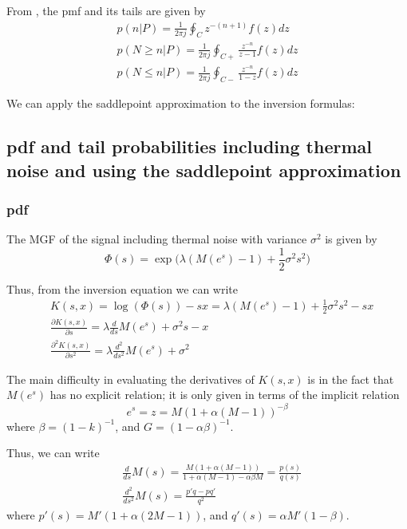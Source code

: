 \documentclass[a4paper]{article}
\begin{document}
From \cite{ber-saddlepoint-approx}, the pmf and its tails are given by
\begin{align}
p(n|P) = \frac{1}{2\pi j}\oint_C z^{-(n+1)}f(z)dz \\
p(N \geq n| P) = \frac{1}{2\pi j}\oint_{C+} \frac{z^{-n}}{z-1}f(z)dz \\
p(N \leq n| P) = \frac{1}{2\pi j}\oint_{C-} \frac{z^{-n}}{1-z}f(z)dz
\end{align}

We can apply the saddlepoint approximation to the inversion formulas: 

\subsection{pdf and tail probabilities including thermal noise and using the saddlepoint approximation}
\subsubsection{pdf}
The MGF of the signal including thermal noise with variance $\sigma^2$ is given by
\begin{equation}
\Phi (s) = \exp\Big(\lambda (M(e^s) - 1) + \frac{1}{2}\sigma^2s^2\Big)
\end{equation}

Thus, from the inversion equation we can write
\begin{align}
& K(s,x) = \log (\Phi(s)) - sx = \lambda (M(e^s) - 1) + \frac{1}{2}\sigma^2s^2 - sx \\
&\frac{\partial K(s,x)}{\partial s} = \lambda \frac{d}{ds}M(e^s) + \sigma^2s - x \\
&\frac{\partial^2 K(s,x)}{\partial s^2} = \lambda \frac{d^2}{ds^2}M(e^s) + \sigma^2
\end{align}

The main difficulty in evaluating the derivatives of $K(s,x)$ is in the fact that $M(e^s)$ has no explicit relation; it is only given in terms of the implicit relation
\begin{equation}
e^s = z = M(1 + \alpha(M-1))^{-\beta}
\end{equation}
where $\beta = (1 - k)^{-1}$, and $G = (1-\alpha\beta)^{-1}$.

Thus, we can write
\begin{align}
&\frac{d}{ds}M(s) = \frac{M(1 + \alpha (M-1))}{1 + \alpha(M-1) - \alpha\beta M} = \frac{p(s)}{q(s)}\\
&\frac{d^2}{ds^2}M(s) = \frac{p'q - pq'}{q^2}
\end{align}
where $p'(s) = M'(1 + \alpha(2M-1))$, and $q'(s) = \alpha M'(1 - \beta)$.
\end{document}
